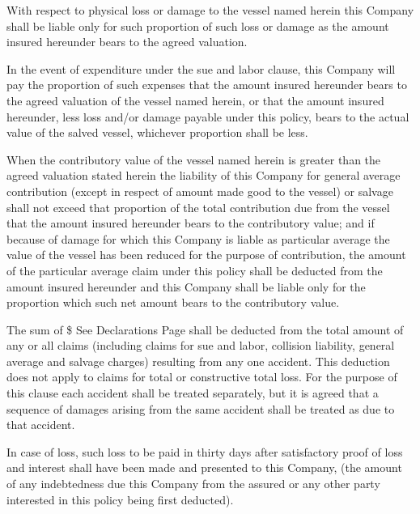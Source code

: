 \documentclass[10pt]{article}
\begin{document}
\begin{linenumbers}
With  respect  to  physical  loss  or  damage  to  the  vessel  named  herein  this  Company  shall  be  liable  only  for such proportion of such loss or damage as the amount insured hereunder bears to the agreed valuation.

In  the  event  of  expenditure  under  the  sue  and  labor  clause,  this  Company  will  pay  the  proportion  of  such expenses  that  the  amount  insured  hereunder  bears  to  the  agreed  valuation  of  the  vessel  named  herein,  or  that  the amount insured hereunder, less loss and/or damage payable under this policy, bears to the actual value of the salved vessel, whichever proportion shall be less.

When   the   contributory   value   of   the   vessel   named   herein   is   greater   than   the   agreed   valuation   stated   herein the  liability  of  this  Company  for  general  average  contribution (except   in   respect   of   amount   made   good   to   the vessel)  or  salvage  shall  not  exceed  that  proportion  of  the  total  contribution  due  from  the  vessel  that  the  amount insured  hereunder  bears  to  the  contributory  value;  and  if  because  of  damage  for  which  this  Company  is  liable  as particular  average  the  value  of  the  vessel  has  been  reduced  for  the  purpose  of  contribution,  the  amount  of  the particular average claim under this policy shall be deducted from the amount insured hereunder and this Company shall be liable only for the proportion which such net amount bears to the contributory value.

The sum of \$	  See Declarations  Page               shall be deducted from the total amount of any or all claims 	(including claims for   sue   and  labor,   collision   liability,   general   average   and  salvage   charges)   resulting   from   any   one   accident.   This deduction  does  not  apply  to  claims  for  total  or  constructive  total  loss.  For  the  purpose  of  this  clause  each  accident shall  be  treated  separately,  but  it  is  agreed  that  a  sequence  of  damages  arising  from  the  same  accident  shall  be treated as due to that accident.

In  case  of  loss,  such  loss  to  be  paid  in  thirty  days  after  satisfactory  proof  of  loss  and  interest  shall  have been  made  and  presented  to  this  Company, (the  amount  of  any  indebtedness  due  this  Company  from  the  assured or any other party interested in this policy being first deducted). 


\end{linenumbers}
\end{document}
